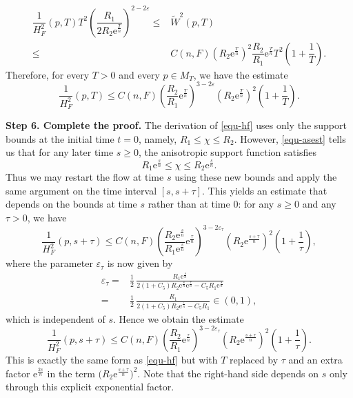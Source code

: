 \documentclass[10pt,a4paper]{amsart}
\numberwithin{equation}{section}
\begin{document}
		\begin{align*}
			\dfrac{1}{H_F^2}(p,T)T^2\left(\dfrac{R_1}{2R_2\mathrm{e}^{\frac{T}{n}}} \right)^{2-2\varepsilon} \leq& \tilde{W}^2(p,T) \\
			\leq & C(n,F) \left(R_2 \mathrm{e}^{\frac{T}{n}}\right)^2 \dfrac{R_2}{R_1}\mathrm{e}^{\frac{T}{n}}T^2\left( 1 + \dfrac{1}{T} \right).
		\end{align*}
		Therefore, for every $T>0$ and every $p\in M_T$, we have the estimate
		\begin{equation}
			\dfrac{1}{H_F^2}(p,T) \leq C(n,F)\left( \dfrac{R_2}{R_1}\mathrm{e}^{\frac{T}{n}} \right)^{3-2\varepsilon}\left( R_2 \mathrm{e}^{\frac{T}{n}}\right)^2 \left(1+\dfrac{1}{T}\right).
			\label{equ-hf}
		\end{equation}
		
		\textbf{Step 6. Complete the proof.}
		The derivation of \eqref{equ-hf} uses only the support bounds at the initial time $t=0$, namely, $R_1\leq\chi\leq R_2$. However, \eqref{equ-asest} tells us that for any later time $s\geq 0$, the anisotropic support function satisfies
		\begin{equation*}
			R_1\mathrm{e}^{\frac{s}{n}}\leq \chi\leq R_2\mathrm{e}^{\frac{s}{n}}.
		\end{equation*}
		Thus we may restart the flow at time $s$ using these new bounds and apply the same argument on the time interval $[s,s+\tau]$. This yields an estimate that depends on the bounds at time $s$ rather than at time $0$: for any $s\geq 0$ and any $\tau>0$, we have
		\begin{equation*}
			\frac{1}{H_F^2}(p,s+\tau)\leq C(n,F)\left(\frac{R_2\mathrm{e}^{\frac{s}{n}}}{R_1\mathrm{e}^{\frac{s}{n}}}\mathrm{e}^{\frac{\tau}{n}}\right)^{3-2\varepsilon_{\tau}}
			\left(R_2\mathrm{e}^{\frac{s+\tau}{n}}\right)^2\left(1+\frac{1}{\tau}\right),
		\end{equation*}
		where the parameter $\varepsilon_{\tau}$ is now given by
		\begin{align*}
			\varepsilon_{\tau}=& \frac{1}{2}\,\frac{R_1\mathrm{e}^{\frac{s}{n}}}{2(1+C_5)R_2\mathrm{e}^{\frac{s}{n}}\mathrm{e}^{\frac{\tau}{n}}-C_5R_1\mathrm{e}^{\frac{s}{n}}}\\
			=& \frac{1}{2}\,\frac{R_1}{2(1+C_5)R_2\mathrm{e}^{\frac{\tau}{n}}-C_5R_1}\in (0,1),
		\end{align*}
		which is independent of $s$. Hence we obtain the estimate
		\begin{equation}
			\dfrac{1}{H_F^2}(p,s+\tau) \leq C(n,F)\left( \dfrac{R_2}{R_1}\mathrm{e}^{\frac{\tau}{n}} \right)^{3-2\varepsilon_{\tau}} \left( R_2 \mathrm{e}^{\frac{s+\tau}{n}} \right)^2 \left( 1+ \dfrac{1}{\tau} \right).
			\label{equ-hfbound}
		\end{equation}
		This is exactly the same form as \eqref{equ-hf} but with $T$ replaced by $\tau$ and an extra factor $\mathrm{e}^{\frac{2s}{n}}$ in the term $\bigl(R_2\mathrm{e}^{\frac{s+\tau}{n}}\bigr)^2$. Note that the right-hand side depends on $s$ only through this explicit exponential factor.
		
\end{document}
